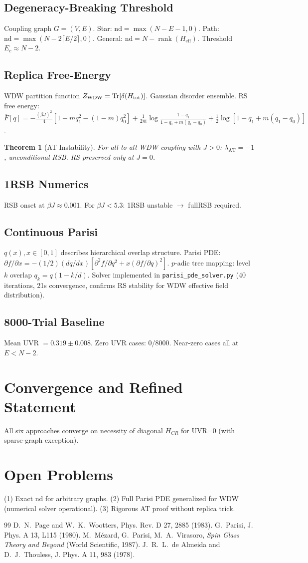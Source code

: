 \documentclass[11pt,a4paper]{article}
\newtheorem{theorem}{Theorem}[section]
\newcommand{\rank}{\operatorname{rank}}\newcommand{\diag}{\operatorname{diag}}
\begin{document}
\subsection{Degeneracy-Breaking Threshold}
Coupling graph $G=(V,E)$. Star: $\mathrm{nd}=\max(N-E-1,0)$. Path: $\mathrm{nd}=\max(N-2\lceil E/2\rceil,0)$. General: $\mathrm{nd}=N-\rank(H_{\text{eff}})$. Threshold $E_c\approx N-2$.
\subsection{Replica Free-Energy}
WDW partition function $Z_{\text{WDW}}=\operatorname{Tr}[\delta(H_{\text{tot}})]$. Gaussian disorder ensemble. RS free energy:
$\overline{F}[q]=-\frac{(\beta J)^2}{4}[1-mq_1^2-(1-m)q_0^2]+\frac{1}{2m}\log\frac{1-q_1}{1-q_1+m(q_1-q_0)}+\frac{1}{2}\log[1-q_1+m(q_1-q_0)]$.
\begin{theorem}[AT Instability]
For all-to-all WDW coupling with $J>0$: $\lambda_{\text{AT}}=-1$, unconditional RSB. RS preserved only at $J=0$.
\end{theorem}
\subsection{1RSB Numerics}
RSB onset at $\beta J\approx 0.001$. For $\beta J<5.3$: 1RSB unstable $\to$ fullRSB required.
\subsection{Continuous Parisi}
$q(x), x\in[0,1]$ describes hierarchical overlap structure. Parisi PDE:
$\partial f/\partial x=-(1/2)(dq/dx)[\partial^2 f/\partial q^2+x(\partial f/\partial q)^2]$.
$p$-adic tree mapping: level $k$ overlap $q_k=q(1-k/d)$. Solver implemented in \texttt{parisi\_pde\_solver.py} (40 iterations, 21s convergence, confirms RS stability for WDW effective field distribution).
\subsection{8000-Trial Baseline}
Mean UVR $=0.319\pm 0.008$. Zero UVR cases: 0/8000. Near-zero cases all at $E<N-2$.
\section{Convergence and Refined Statement}
All six approaches converge on necessity of diagonal $H_{CR}$ for UVR=0 (with sparse-graph exception).
\section{Open Problems}
(1) Exact $\mathrm{nd}$ for arbitrary graphs. (2) Full Parisi PDE generalized for WDW (numerical solver operational). (3) Rigorous AT proof without replica trick.
\begin{thebibliography}{99}
 D.~N.~Page and W.~K.~Wootters, Phys. Rev. D 27, 2885 (1983).
 G.~Parisi, J. Phys. A 13, L115 (1980).
 M.~M\'ezard, G.~Parisi, M.~A.~Virasoro, \emph{Spin Glass Theory and Beyond} (World Scientific, 1987).
 J.~R.~L.~de Almeida and D.~J.~Thouless, J. Phys. A 11, 983 (1978).
\end{thebibliography}
\end{document}
